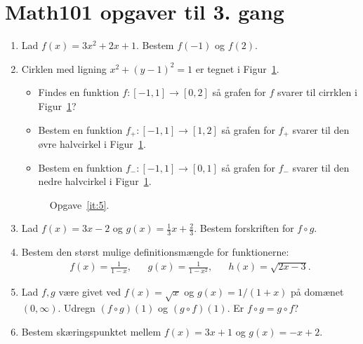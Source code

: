 \newpage
\section{Math101 opgaver til 3. gang}
\begin{enumerate}
	
	\item Lad $f(x)=3x^2+2x+1$. Bestem $f(-1)$ og $f(2)$.
	
	\item \label{it:5} Cirklen med ligning $x^{2} +(y-1)^{2}=1$ er tegnet i Figur~\ref{fig:5}.
	\begin{itemize}
		\item Findes en funktion $f\colon [-1,1]\to [0,2]$ så grafen for $f$ svarer til cirrklen i Figur~\ref{fig:5}?
		\item Bestem en funktion $f_+\colon [-1,1]\to [1,2]$ så grafen for $f_+$ svarer til den øvre halvcirkel i Figur~\ref{fig:5}.
		\item Bestem en funktion $f_-\colon [-1,1]\to [0,1]$ så grafen for $f_-$ svarer til den nedre halvcirkel i Figur~\ref{fig:5}.
	\end{itemize}	
	\begin{figure}
		\centering
		\caption{Opgave~\ref{it:5}.}
		\label{fig:5}
	\end{figure}

	
	\item Lad $f(x)=3x-2$ og $g(x)=\frac{1}{3}x+\frac{2}{3}$. Bestem forskriften for $f\circ g$.

	\item Bestem den størst mulige definitionsmængde for funktionerne:
	\begin{align*}
	f(x)=\frac{1}{1-x},&& g(x)=\frac{1}{1-x^2},&& h(x)=\sqrt{2x-3}.
	\end{align*}
	
	
	\item  Lad $f,g$ være givet ved $f(x)=\sqrt{x}$ og $g(x)=1/(1+x)$ på domænet $(0,\infty)$. Udregn $(f\circ g)(1)$ og $(g\circ f)(1)$. Er $f\circ g=g\circ f$?
	
	\item Bestem skæringspunktet mellem $f(x)=3x+1$ og $g(x)=-x+2$.	
	

\end{enumerate}
